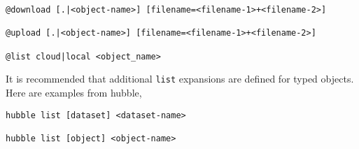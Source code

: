 %
\begin{verbatim}
@download [.|<object-name>] [filename=<filename-1>+<filename-2>]

@upload [.|<object-name>] [filename=<filename-1>+<filename-2>]

@list cloud|local <object_name>
\end{verbatim}
%
It is recommended that additional \texttt{list} expansions are defined for typed objects. Here are examples from hubble,
%
\begin{verbatim}
hubble list [dataset] <dataset-name>

hubble list [object] <object-name>
\end{verbatim}